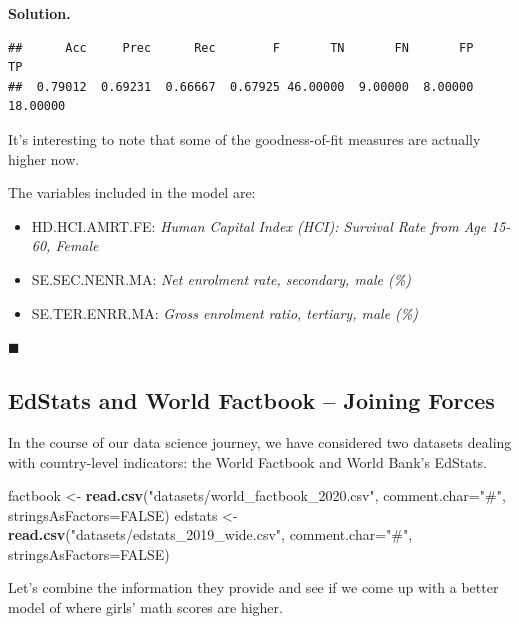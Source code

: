\documentclass[10pt,b5paper,krantz1]{krantz}
\newenvironment{Shaded}{\begin{snugshade}}{\end{snugshade}}
\newcommand{\DataTypeTok}[1]{\textcolor[rgb]{0.27,0.27,0.27}{#1}}
\newcommand{\KeywordTok}[1]{\textcolor[rgb]{0.27,0.27,0.27}{\textbf{#1}}}
\newcommand{\NormalTok}[1]{#1}
\newcommand{\OtherTok}[1]{\textcolor[rgb]{0.37,0.37,0.37}{#1}}
\newcommand{\StringTok}[1]{\textcolor[rgb]{0.5,0.5,0.5}{#1}}
\providecommand{\tightlist}{%
  \setlength{\itemsep}{0pt}\setlength{\parskip}{0pt}}
\newenvironment{solution}{%
\bigskip\noindent\textbf{Solution. }%
\it\ignorespaces%
\ignorespaces%
}{\ignorespaces%
\hfill$\blacksquare$%
}
\begin{document}
\begin{solution}
\begin{verbatim}
##      Acc     Prec      Rec        F       TN       FN       FP       TP 
##  0.79012  0.69231  0.66667  0.67925 46.00000  9.00000  8.00000 18.00000
\end{verbatim}

It's interesting to note that some of the
goodness-of-fit measures are actually higher now.

The variables included in the model are:

\begin{itemize}
\tightlist
\item
  HD.HCI.AMRT.FE: \emph{Human Capital Index (HCI): Survival Rate from Age 15-60, Female}
\item
  SE.SEC.NENR.MA: \emph{Net enrolment rate, secondary, male (\%)}
\item
  SE.TER.ENRR.MA: \emph{Gross enrolment ratio, tertiary, male (\%)}
\end{itemize}

\end{solution}

\hypertarget{edstats-and-world-factbook-joining-forces}{%
\subsection{EdStats and World Factbook -- Joining Forces}\label{edstats-and-world-factbook-joining-forces}}

In the course of our data science journey, we have considered two datasets
dealing with country-level indicators: the World Factbook and
World Bank's EdStats.

\begin{Shaded}
\begin{Highlighting}[]
\NormalTok{factbook <-}\StringTok{ }\KeywordTok{read.csv}\NormalTok{(}\StringTok{"datasets/world_factbook_2020.csv"}\NormalTok{,}
    \DataTypeTok{comment.char=}\StringTok{"#"}\NormalTok{, }\DataTypeTok{stringsAsFactors=}\OtherTok{FALSE}\NormalTok{)}
\NormalTok{edstats <-}\StringTok{ }\KeywordTok{read.csv}\NormalTok{(}\StringTok{"datasets/edstats_2019_wide.csv"}\NormalTok{,}
    \DataTypeTok{comment.char=}\StringTok{"#"}\NormalTok{, }\DataTypeTok{stringsAsFactors=}\OtherTok{FALSE}\NormalTok{)}
\end{Highlighting}
\end{Shaded}

Let's combine the information they provide
and see if we come up with a better model of where
girls' math scores are higher.
\end{document}

